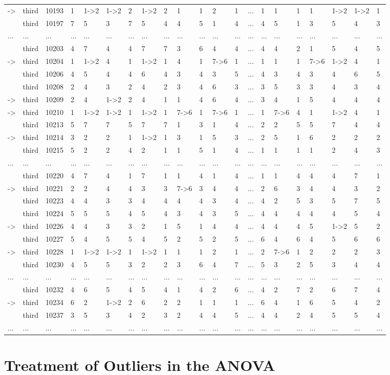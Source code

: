 \begin{landscape}
{\begin{longtable}{lllllllllllllllllllll}
-\textgreater &third&10193&1&1-\textgreater 2&1-\textgreater 2&2&1-\textgreater 2&2&1&1&2&1&...&1&1&1&1&1-\textgreater 2&1-\textgreater 2&1\tabularnewline
&third&10197&7&5&3&7&5&4&4&5&1&4&...&4&5&1&3&5&4&3\tabularnewline
...&...&...&...&...&...&...&...&...&...&...&...&...&...&...&...&...&...&...&...&...\tabularnewline
&third&10203&4&7&4&4&7&7&3&6&4&4&...&4&4&2&1&5&4&5\tabularnewline
-\textgreater &third&10204&1&1-\textgreater 2&4&1&1-\textgreater 2&1&4&1&7-\textgreater 6&1&...&1&1&1&7-\textgreater 6&1-\textgreater 2&4&1\tabularnewline
&third&10206&4&5&4&4&6&4&3&4&3&5&...&4&3&4&3&4&6&5\tabularnewline
&third&10208&2&4&3&2&4&2&3&4&6&3&...&3&5&3&3&4&3&4\tabularnewline
-\textgreater &third&10209&2&4&1-\textgreater 2&2&4&1&1&4&6&4&...&3&4&1&5&4&4&4\tabularnewline
-\textgreater &third&10210&1&1-\textgreater 2&1-\textgreater 2&1&1-\textgreater 2&1&7-\textgreater 6&1&7-\textgreater 6&1&...&1&7-\textgreater 6&4&1&1-\textgreater 2&4&1\tabularnewline
&third&10213&5&7&7&5&7&7&1&3&1&4&...&2&2&5&5&7&4&4\tabularnewline
-\textgreater &third&10214&3&2&2&1&1-\textgreater 2&1&3&1&5&3&...&2&5&1&6&2&2&2\tabularnewline
&third&10215&5&2&2&4&2&1&1&5&1&4&...&1&1&1&1&2&4&3\tabularnewline
...&...&...&...&...&...&...&...&...&...&...&...&...&...&...&...&...&...&...&...&...\tabularnewline
&third&10220&4&7&4&1&7&1&1&4&1&4&...&1&1&4&4&4&7&1\tabularnewline
-\textgreater &third&10221&2&2&4&4&3&3&7-\textgreater 6&3&4&4&...&2&6&3&4&4&3&2\tabularnewline
&third&10223&4&4&3&3&4&4&4&4&3&4&...&4&2&5&3&5&7&5\tabularnewline
&third&10224&5&5&5&4&5&4&3&4&3&5&...&4&4&4&4&4&5&4\tabularnewline
-\textgreater &third&10226&4&4&3&3&2&1&5&1&4&4&...&4&4&4&5&1-\textgreater 2&5&2\tabularnewline
&third&10227&5&4&5&5&4&5&2&5&2&5&...&6&4&6&4&5&6&6\tabularnewline
-\textgreater &third&10228&1&1-\textgreater 2&1-\textgreater 2&1&1-\textgreater 2&1&1&1&2&1&...&2&7-\textgreater 6&1&2&2&2&3\tabularnewline
&third&10230&4&5&5&3&2&2&3&6&4&7&...&5&3&2&5&3&4&4\tabularnewline
...&...&...&...&...&...&...&...&...&...&...&...&...&...&...&...&...&...&...&...&...\tabularnewline
&third&10232&4&6&5&4&5&4&1&4&2&6&...&4&2&7&2&6&7&4\tabularnewline
-\textgreater &third&10234&6&2&1-\textgreater 2&2&6&2&2&1&1&1&...&6&4&1&6&5&4&2\tabularnewline
&third&10237&3&5&3&4&2&3&2&4&4&5&...&4&4&2&4&5&5&4\tabularnewline
...&...&...&...&...&...&...&...&...&...&...&...&...&...&...&...&...&...&...&...&...\tabularnewline
\hline
\end{longtable}}\end{landscape}


\section{Treatment of Outliers in the ANOVA}
\label{sec:outliers-anova-motivation}

